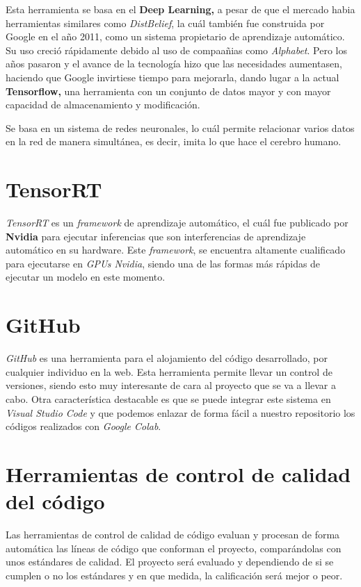 Esta herramienta se basa en el \textbf{Deep Learning,} a pesar de que el mercado habia herramientas similares como \textit{DistBelief}\cite{distBelief}, la cuál también fue construida por Google en el año 2011, como un sistema propietario de aprendizaje automático. Su uso creció rápidamente debido al uso de compaañias como \textit{Alphabet}. Pero los años pasaron y el avance de la tecnología 
hizo que las necesidades aumentasen, haciendo que Google invirtiese tiempo para mejorarla, dando lugar a la actual \textbf{Tensorflow,} una herramienta con un conjunto de datos mayor y con mayor capacidad de almacenamiento y modificación.

Se basa en un sistema de redes neuronales, lo cuál permite relacionar varios datos en la red de manera simultánea, es decir, imita lo que hace el cerebro humano.

\section{TensorRT}
\textit{TensorRT}\cite{tensorrt} es un \textit{framework} de aprendizaje automático, el cuál fue publicado por \textbf{Nvidia} para ejecutar inferencias que son interferencias de aprendizaje automático en su hardware. Este \textit{framework}, se encuentra altamente cualificado para ejecutarse en \textit{GPUs Nvidia}, siendo una de las formas más rápidas de ejecutar un modelo en este momento.


\section{GitHub}
\textit{GitHub}\cite{github} es una herramienta para el alojamiento del código desarrollado, por cualquier individuo en la web. Esta herramienta permite llevar un control de versiones, siendo esto muy interesante de cara al proyecto que se va a llevar a cabo.
Otra característica destacable es que se puede integrar este sistema en \textit{Visual Studio Code}\cite{visualStudioCode} y que podemos enlazar de forma fácil a nuestro repositorio los códigos realizados con \textit{Google Colab}\cite{colab}.

\clearpage

\section{Herramientas de control de calidad del código}
Las herramientas de control de calidad de código evaluan y procesan de forma automática las líneas de código que conforman el proyecto, comparándolas con unos estándares de calidad. El proyecto será evaluado y dependiendo de si se cumplen o no los estándares y en que medida, la calificación será mejor o peor.

